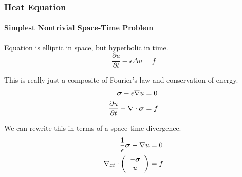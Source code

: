 \documentclass[18pt,xcolor=table]{beamer}
\begin{document}
\begin{frame}[t]
\frametitle{Heat Equation}
\framesubtitle{Simplest Nontrivial Space-Time Problem}  %

Equation is elliptic in space, but hyperbolic in time.
\begin{equation*}
  \frac{\partial u}{\partial t}-\epsilon\Delta u=f
\end{equation*}

This is really just a composite of Fourier's law and conservation of energy.
\begin{equation*}
\begin{aligned}
\boldsymbol\sigma-\epsilon\nabla u&=0\\
\frac{\partial u}{\partial t}-\nabla\cdot\boldsymbol\sigma&=f
\end{aligned}
\end{equation*}

We can rewrite this in terms of a space-time divergence.
\begin{equation*}
\begin{aligned}
\frac{1}{\epsilon}\boldsymbol\sigma-\nabla u&=0\\
\nabla_{xt}\cdot\left( \begin{array}{c} -\boldsymbol\sigma\\ u\\ \end{array} \right)&=f
\end{aligned}
\end{equation*}

\end{frame}
\end{document}
